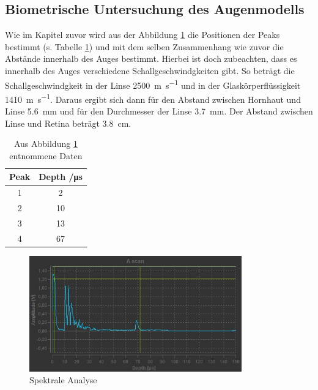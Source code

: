 \subsection{Biometrische Untersuchung des Augenmodells}
Wie im Kapitel zuvor wird aus der Abbildung \ref{fig:AU} die Positionen der
Peaks bestimmt (s. Tabelle \ref{tab:AU}) und mit dem selben Zusammenhang wie zuvor die Abstände innerhalb
des Auges bestimmt. Hierbei ist doch zubeachten, dass es innerhalb des Auges
verschiedene Schallgeschwindgkeiten gibt. So beträgt die Schallgeschwindgkeit
in der Linse \SI{2500}{\meter\per\second} und in der Glaskörperflüssigkeit
\SI{1410}{\meter \per \second}.
Daraus ergibt sich dann für den Abstand zwischen Hornhaut und Linse
\SI{5.6}{\milli\meter} und für den Durchmesser der Linse \SI{3.7}{\milli\meter}.
Der Abstand zwischen Linse und Retina beträgt \SI{3.8}{\centi\meter}.

\begin{table}
  \centering
  \caption{Aus Abbildung \ref{fig:AU} entnommene Daten}
  \begin{tabular}{c c}
  \toprule
  Peak & Depth /\si{\micro \second} \\
  \midrule
  1 & 2 \\
  2 & 10 \\
  3 & 13 \\
  4 & 67 \\
  \bottomrule
\end{tabular}
\label{tab:AU}
\end{table}

\begin{figure}
  \centering
  \includegraphics[height = 5cm]{FFS-Data/a_scan_auge.jpg}
  \caption{Spektrale Analyse}
  \label{fig:AU}
\end{figure}
